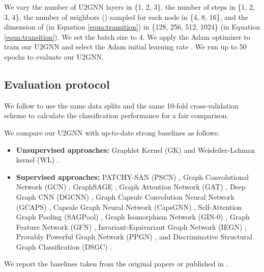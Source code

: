 \documentclass[twoside,leqno,twocolumn]{article}
\newcommand{\citep}{\cite}
\begin{document}
We vary the number  of U2GNN layers in \{1, 2, 3\}, the number of steps  in \{1, 2, 3, 4\}, the number of neighbors () sampled for each node in \{4, 8, 16\}, and the dimension  of  (in Equation \ref{equa:transition}) in \{128, 256, 512, 1024\} (in Equation \ref{equa:transition}).
We set the batch size to 4.
We apply the Adam optimizer \citep{kingma2014adam} to train our U2GNN and select the Adam initial learning rate  .
We run up to 50 epochs to evaluate our U2GNN. 



\subsection{Evaluation protocol}
\label{subsec:eval}

{We follow \citep{xu2019powerful,xinyi2019capsule,maron2019provably,seo2019discriminative,Chen2019ArePG} to use the same data splits and the same 10-fold cross-validation scheme to calculate the classification performance for a fair comparison}.


We compare our U2GNN with up-to-date strong baselines as follows:
\begin{itemize}
\item \textbf{Unsupervised approaches:} 
Graphlet Kernel (GK) \citep{shervashidze2009efficient} and  Weisfeiler-Lehman kernel (WL) \citep{shervashidze2011weisfeiler}.

\item \textbf{Supervised approaches:} 
PATCHY-SAN (PSCN) \citep{niepert2016learning}, Graph Convolutional Network (GCN) \citep{kipf2017semi}, GraphSAGE \citep{hamilton2017inductive}, Graph Attention Network (GAT) \citep{velickovic2018graph}, Deep Graph CNN (DGCNN) \citep{zhang2018end}, Graph Capsule Convolution Neural Network (GCAPS) \citep{verma2018graph}, Capsule Graph Neural Network (CapsGNN) \citep{xinyi2019capsule}, Self-Attention Graph Pooling (SAGPool) \citep{Lee2019SelfAttentionGP}, Graph Isomorphism Network (GIN-0) \citep{xu2019powerful}, Graph Feature Network (GFN) \citep{Chen2019ArePG}, Invariant-Equivariant Graph Network (IEGN) \citep{maron2019invariant}, Provably Powerful Graph Network (PPGN) \citep{maron2019provably}, and Discriminative Structural Graph Classification (DSGC) \citep{seo2019discriminative}.
\end{itemize}

We report the baselines taken from the original papers or published in \citep{ivanov2018anonymous,verma2018graph,xinyi2019capsule,FAN2020107084,Chen2019ArePG,seo2019discriminative}.
\end{document}
